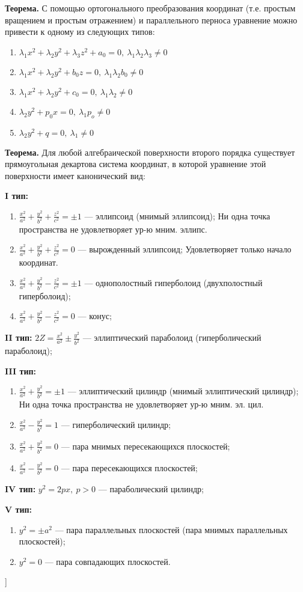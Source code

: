 \textbf{Теорема.} С помощью ортогонального преобразования координат (т.е. простым вращением и простым отражением) и параллельного перноса уравнение можно привести к одному из следующих типов:
\begin{enumerate}
    \item $\lambda_1x^2 + \lambda_2y^2 +\lambda_3z^2 + a_0 = 0, \ \lambda_1 \lambda_2 \lambda_3 \neq 0$
    \item $\lambda_1x^2 + \lambda_2y^2 + b_0z = 0, \ \lambda_1 \lambda_2 b_0 \neq 0$
    \item $\lambda_1x^2 + \lambda_2y^2 + c_0 = 0, \ \lambda_1 \lambda_2 \neq 0$
    \item $\lambda_2y^2 + p_0x = 0 , \ \lambda_1 p_o \neq 0$
    \item $\lambda_2y^2 + q = 0, \ \lambda_1 \neq 0$
\end{enumerate}


\textbf{Теорема.} Для любой алгебраической поверхности второго порядка существует прямоугольная декартова система координат, в которой уравнение этой поверхности имеет канонический вид:

\textbf{I тип:}
\begin{enumerate}
    \item $\frac{x^2}{a^2} + \frac{y^2}{b^2} + \frac{z^2}{c^2} = \pm1$ --- эллипсоид (мнимый эллипсоид); Ни одна точка пространства не удовлетворяет ур-ю мним. эллипс.
    \item $\frac{x^2}{a^2} + \frac{y^2}{b^2} + \frac{z^2}{c^2} = 0$ --- вырожденный эллипсоид; Удовлетворяет только начало координат.
    \item $\frac{x^2}{a^2} + \frac{y^2}{b^2} - \frac{z^2}{c^2} = \pm1$ --- однополостный гиперболоид (двухполостный гиперболоид);
    \item $\frac{x^2}{a^2} + \frac{y^2}{b^2} - \frac{z^2}{c^2} = 0$ --- конус;
\end{enumerate}

\textbf{II тип:}
 $ 2 Z = \frac{x^2}{a^2} \pm \frac{y^2}{b^2}$ --- эллиптический параболоид (гиперболический параболоид);

\textbf{III тип:}
\begin{enumerate}
    \item $\frac{x^2}{a^2} + \frac{y^2}{b^2} = \pm1$ --- эллиптический цилиндр (мнимый эллиптический цилиндр); Ни одна точка пространства не удовлетворяет ур-ю мним. эл. цил.
    \item $\frac{x^2}{a^2} - \frac{y^2}{b^2} = 1$ --- гиперболический цилиндр;
    \item $\frac{x^2}{a^2} + \frac{y^2}{b^2} = 0$ --- пара мнимых пересекающихся плоскостей;
    \item $\frac{x^2}{a^2} - \frac{y^2}{b^2} = 0$ --- пара пересекающихся плоскостей;
\end{enumerate}
\textbf{IV тип:} $y^2 = 2px,~p > 0$ --- параболический цилиндр;

\textbf{V тип:}
\begin{enumerate}
    \item $y^2 = \pm a^2$ --- пара параллельных плоскостей (пара мнимых параллельных плоскостей);
    \item $y^2 = 0$ --- пара совпадающих плоскостей.
\end{enumerate}


\bigbreak
[\cite[page 192-200, 329-341]{kim}]
